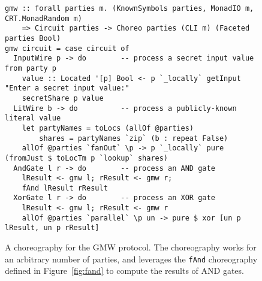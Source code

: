 \documentclass[sigplan,screen]{acmart}
\newcommand{\inlinecode}[2][haskell]{\texttt{#2}}
\begin{document}
\begin{figure*}
\begin{mdframed}
\begin{verbatim}
gmw :: forall parties m. (KnownSymbols parties, MonadIO m, CRT.MonadRandom m)
    => Circuit parties -> Choreo parties (CLI m) (Faceted parties Bool)
gmw circuit = case circuit of
  InputWire p -> do        -- process a secret input value from party p
    value :: Located '[p] Bool <- p `_locally` getInput "Enter a secret input value:"
    secretShare p value
  LitWire b -> do          -- process a publicly-known literal value
    let partyNames = toLocs (allOf @parties)
        shares = partyNames `zip` (b : repeat False)
    allOf @parties `fanOut` \p -> p `_locally` pure (fromJust $ toLocTm p `lookup` shares)
  AndGate l r -> do        -- process an AND gate
    lResult <- gmw l; rResult <- gmw r;
    fAnd lResult rResult
  XorGate l r -> do        -- process an XOR gate
    lResult <- gmw l; rResult <- gmw r
    allOf @parties `parallel` \p un -> pure $ xor [un p lResult, un p rResult]
\end{verbatim}
\caption{A choreography for the GMW protocol. The choreography works for an arbitrary number of parties, and leverages the \inlinecode{fAnd} choreography defined in Figure~\ref{fig:fand} to compute the results of AND gates.}
\label{fig:gmw}
\end{mdframed}
\end{figure*}
\end{document}
